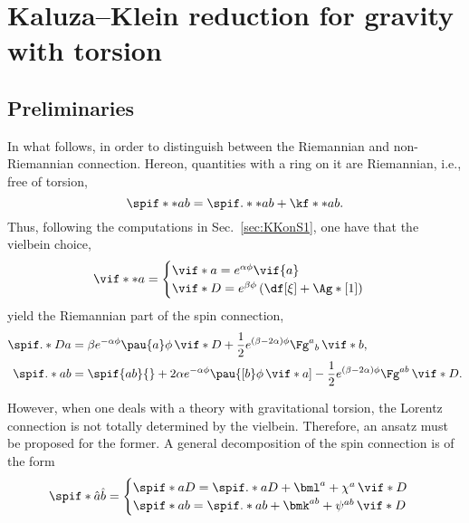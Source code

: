 \chapter{Kaluza--Klein reduction for gravity with torsion}

\section{Preliminaries}


In what follows, in order to distinguish between the Riemannian and non-Riemannian connection. Hereon, quantities with a ring on it are Riemannian, i.e., free of torsion,
\begin{equation*}
  \spif**{a}{b} = \spif.**{a}{b} + \kf**{a}{b}.
\end{equation*}
Thus, following the computations in Sec.~\ref{sec:KKonS1}, one have that the vielbein choice,
\begin{equation*}
  \vif**{a} = 
  \begin{cases}
    \vif*{a} = e^{\alpha\phi} \vif{a}\\
    \vif*{D} = e^{\beta\phi} \left( \df[\xi] + \Ag*[1] \right)
  \end{cases}
\end{equation*}
yield the Riemannian part of the spin connection,
\begin{align}
  \spif.*{Da}{} &= \beta e^{-\alpha \phi} \pau{a} \phi \, \vif*{D} + \frac{1}{2} e^{(\beta - 2\alpha) \phi} \Fg^{a}{}_{b} \, \vif*{b}, \\
  \spif.*{ab}{} &= \spif{ab}{} + 2 \alpha e^{ - \alpha \phi } \pau{[b} \phi \, \vif*{a]} - \frac{1}{2} e^{(\beta - 2\alpha) \phi} \Fg^{a b} \, \vif*{D}.
\end{align}

However, when one deals with a theory with gravitational torsion, the Lorentz connection is not totally determined by the vielbein. Therefore, an ansatz must be proposed for the former. A general decomposition of the spin connection is of the form
\begin{equation}
  \spif*{ \hat{a} \hat{b}}{} = 
  \begin{cases}
    \spif*{a D}{} = \spif.*{a D}{} + \bml^a  + \chi^a \, \vif*{D} \\
    \spif*{a b}{} = \spif.*{ab}{}  + \bmk^{ab} + \psi^{ab} \, \vif*{D}
  \end{cases}
\end{equation}

